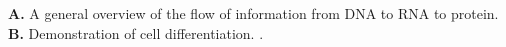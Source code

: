 \textbf{A.} A general overview of the flow of information from DNA to RNA to protein. \textbf{B.} Demonstration of cell differentiation. \cite{bisceglia_2010}.